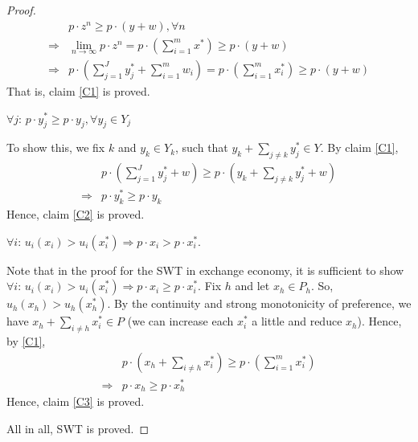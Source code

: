 \documentclass[11pt]{elegantbook}
\begin{document}
\begin{proof}
    \begin{equation}
        \begin{aligned}
            &p\cdot z^n\geq p\cdot (y+w), \forall n\\
            \Rightarrow &\lim_{n \rightarrow \infty} p\cdot z^n=p\cdot\left(\sum_{i=1}^m x^*\right)\geq p\cdot (y+w)\\
            \Rightarrow & p\cdot\left(\sum_{j=1}^J y_j^*+\sum_{i=1}^m w_i\right)=p\cdot \left(\sum_{i=1}^mx_i^*\right)\geq p\cdot (y+w)
        \end{aligned}
        \nonumber
    \end{equation}
    That is, claim \ref{C1} is proved.
    \begin{claim}\label{C2}
        $\forall j$: $p\cdot y_j^*\geq p\cdot y_j, \forall y_j\in Y_j$
    \end{claim}
    To show this, we fix $k$ and $y_k\in Y_k$, such that $y_k+\sum_{j\neq k}y_j^*\in Y$. By claim \ref{C1},
    \begin{equation}
        \begin{aligned}
            &p\cdot (\sum_{j=1}^J y_j^*+w)\geq p\cdot \left(y_k+\sum_{j\neq k}y_j^*+w\right)\\
            \Rightarrow &p\cdot y_k^*\geq p\cdot y_k
        \end{aligned}
        \nonumber
    \end{equation}
    Hence, claim \ref{C2} is proved.
    \begin{claim}\label{C3}
        $\forall i$: $u_i(x_i)> u_i(x_i^*) \Rightarrow p\cdot x_i>p\cdot x_i^*$.
    \end{claim}
    Note that in the proof for the SWT in exchange economy, it is sufficient to show $\forall i$: $u_i(x_i)> u_i(x_i^*) \Rightarrow p\cdot x_i\geq p\cdot x_i^*$. Fix $h$ and let $x_h\in P_h$. So, $u_h(x_h)>u_h(x_h^*)$. By the continuity and strong monotonicity of preference, we have $x_h+\sum_{i\neq h}x_i^*\in P$ (we can increase each $x_i^*$ a little and reduce $x_h$). Hence, by \ref{C1},
    \begin{equation}
        \begin{aligned}
            &p\cdot (x_h+\sum_{i\neq h}x_i^*)\geq p\cdot \left(\sum_{i=1}^m x_i^*\right)\\
            \Rightarrow &p\cdot x_h\geq p\cdot x_h^*
        \end{aligned}
        \nonumber
    \end{equation}
    Hence, claim \ref{C3} is proved.

    All in all, SWT is proved.
\end{proof}
\end{document}
